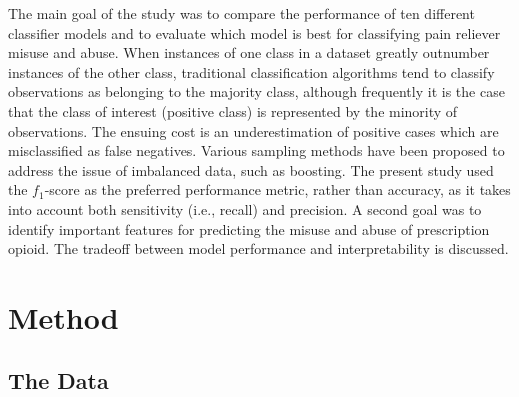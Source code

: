 \documentclass[sigconf]{acmart}
\begin{document}
The main goal of the study was to compare the performance of ten different 
classifier models and to evaluate which model is best for classifying pain 
reliever misuse and abuse. When instances of one class in a dataset greatly 
outnumber instances of the other class, traditional classification algorithms
tend to classify observations as belonging to the majority class, although
frequently it is the case that the class of interest (positive class)
is represented by the minority of observations. The ensuing cost is an
underestimation of positive cases which are misclassified as false negatives. 
Various sampling methods have been proposed to address the issue of imbalanced 
data, such as boosting. The present study used the $f_1$-score as the
preferred performance metric, rather than accuracy, as it takes into account 
both sensitivity (i.e., recall) and precision. A second goal was to identify 
important features for predicting the misuse and abuse of prescription opioid. 
The tradeoff between model performance and interpretability is discussed. 



\section{Method}

\subsection{The Data}
\end{document}
